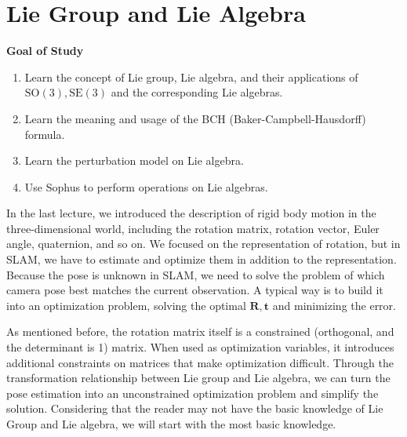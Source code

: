 \chapter{Lie Group and Lie Algebra}
\label{cpt:4}
\begin{mdframed}
    \textbf{Goal of Study}
    \begin{enumerate}
        \item Learn the concept of Lie group, Lie algebra, and their applications of $ \mathrm{SO}( 3 ), \mathrm{SE}( 3 ) $ and the corresponding Lie algebras.
        \item Learn the meaning and usage of the BCH (Baker-Campbell-Hausdorff) formula.
        \item Learn the perturbation model on Lie algebra.
        \item Use Sophus to perform operations on Lie algebras.
    \end{enumerate}
\end{mdframed}

In the last lecture, we introduced the description of rigid body motion in the three-dimensional world, including the rotation matrix, rotation vector, Euler angle, quaternion, and so on. We focused on the representation of rotation, but in SLAM, we have to estimate and optimize them in addition to the representation. Because the pose is unknown in SLAM, we need to solve the problem of which camera pose best matches the current observation. A typical way is to build it into an optimization problem, solving the optimal $ \mathbf{R}, \mathbf{t}$ and minimizing the error.

As mentioned before, the rotation matrix itself is a constrained (orthogonal, and the determinant is 1) matrix. When used as optimization variables, it introduces additional constraints on matrices that make optimization difficult. Through the transformation relationship between Lie group and Lie algebra, we can turn the pose estimation into an unconstrained optimization problem and simplify the solution. Considering that the reader may not have the basic knowledge of Lie Group and Lie algebra, we will start with the most basic knowledge.

\newpage

\newpage

